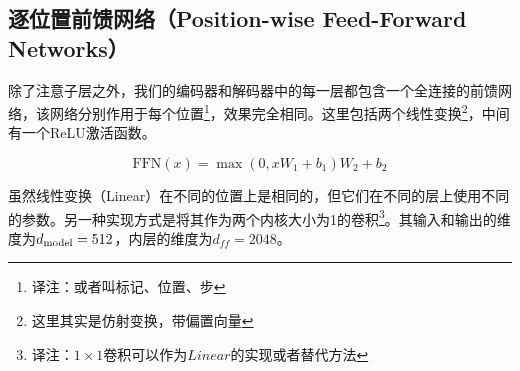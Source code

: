 \subsection{逐位置前馈网络（Position-wise Feed-Forward Networks）}\label{sec:ffn}

除了注意子层之外，我们的编码器和解码器中的每一层都包含一个全连接的前馈网络，该网络分别作用于每个位置\footnote{译注：或者叫标记、位置、步}，效果完全相同。这里包括两个线性变换\footnote{这里其实是仿射变换，带偏置向量}，中间有一个ReLU激活函数。

\begin{equation}
   \mathrm{FFN}(x)=\max(0, xW_1 + b_1) W_2 + b_2
\end{equation}


虽然线性变换（Linear）在不同的位置上是相同的，但它们在不同的层上使用不同的参数。另一种实现方式是将其作为两个内核大小为1的卷积\footnote{$译注：1\times 1卷积可以作为Linear的实现或者替代方法$}。其输入和输出的维度为$d_{\text{model}}=512$，内层的维度为$d_{ff}=2048$。





